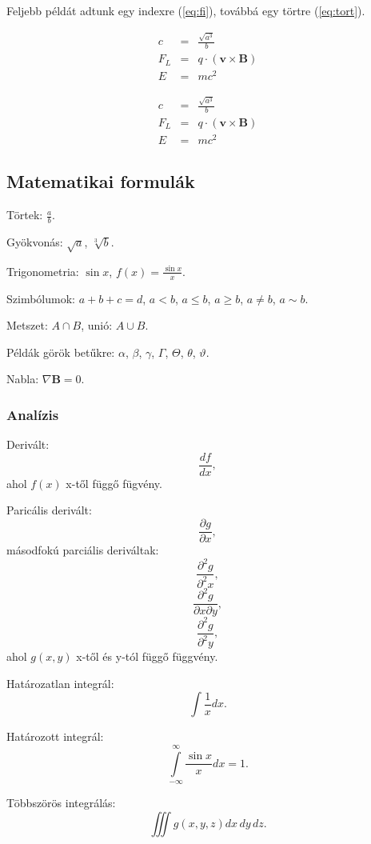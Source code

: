 \documentclass[a4paper,12pt]{article}
\begin{document}
Feljebb példát adtunk egy indexre (\ref{eq:fi}), továbbá egy törtre (\ref{eq:tort}).

\begin{eqnarray}
c & = & \frac{\sqrt{a^3}}{b} \\
F_L & = & q \cdot (\mathbf{v} \times \mathbf{B}) \\
E &=& m c^2
\end{eqnarray}

\begin{eqnarray*}
c & = & \frac{\sqrt{a^3}}{b} \\
F_L & = & q \cdot (\mathbf{v} \times \mathbf{B}) \\
E &=& m c^2
\end{eqnarray*}

\subsection{Matematikai formulák}

Törtek: $\frac{a}{b}$.

Gyökvonás: $\sqrt{a}$, $\sqrt[3]{b}$.

Trigonometria: $\sin x$, $f\left(x\right)=\frac{\sin x}{x}$.

Szimbólumok: $a+b+c=d$, $a<b$, $a \le b$, $a \ge b$, $a \ne b$, $a \sim b$.

Metszet: $A \cap B$, unió: $A \cup B$.

Példák görök betűkre: $\alpha$, $\beta$, $\gamma$,  $\Gamma$, $\Theta$, $\theta$, $\vartheta$.

Nabla: $\nabla \mathbf{B} = 0$.

\subsubsection{Analízis}

Derivált: $$\frac{df}{dx},$$ ahol $f\left(x\right)$ x-től függő fügvény.

Paricális derivált: $$ \frac{\partial g}{\partial x},$$  másodfokú parciális deriváltak:  $$\frac{\partial^2 g}{\partial^2 x},$$ $$\frac{\partial^2 g}{\partial x \partial y},$$ $$\frac{\partial^2 g}{\partial^2 y},$$ ahol $g\left(x,y\right)$ x-től és y-tól függő függvény.

Határozatlan integrál: $$ \int \frac{1}{x} dx.$$

Határozott integrál: $$\int\limits_{-\infty}^{\infty} \frac{\sin x}{x} dx = 1.$$

Többszörös integrálás: $$\iiint g\left(x,y,z\right) dx\,dy\,dz.$$
\end{document}
